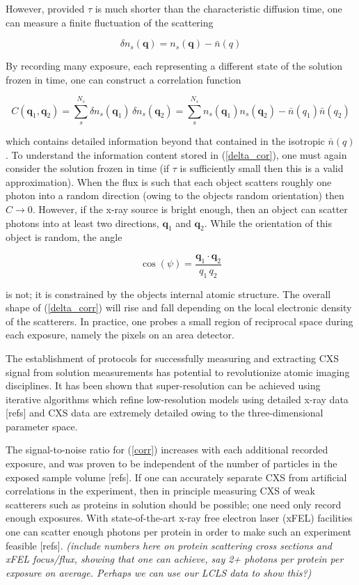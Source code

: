 \documentclass [11pt,fleqn]{article}
\def \be {\begin{equation}}
\def \ee {\end{equation}}
\begin{document}
However, provided $\tau$ is much shorter than the characteristic diffusion time, one can measure a finite fluctuation of the scattering

\be \label{delta_s}
\delta n_s(\bm q) = n_s (\bm q) - \bar n (q )
\ee

By recording many exposure, each representing a different state of the solution frozen in time, one can construct a correlation function

\be \label{delta_cor}
C( \bm q_1, \bm q_2 ) = \sum_s^{N_s} \delta n_s( \bm q_1 )\, \delta n_s( \bm q_2 ) = \sum_s^{N_s} n_s( \bm q_1) n_s (\bm q_2 )  - \bar n( q_1) \bar n(q_2)
\ee

which contains detailed information beyond that contained in the isotropic $\bar n( q)$. To understand the information content stored in (\ref{delta_cor}), one must again consider the solution frozen in time (if $\tau$ is sufficiently small then this is a valid approximation). When the flux is such that each object scatters roughly one photon into a random direction (owing to the objects random orientation) then $C \rightarrow 0$. However, if the x-ray source is bright enough, then an object can scatter photons into at least two directions, $\bm q_1$ and $\bm q_2$. While the orientation of this object is random, the angle 

\be
\cos (\psi) = \frac{\bm q_1 \cdot \bm q_2}{q_1 \, q_2 } 
\ee

is not; it is constrained by the objects internal atomic structure. The overall shape of (\ref{delta_corr}) will rise and fall depending on the local electronic density of the scatterers.  In practice, one probes a small region of reciprocal space during each exposure, namely the pixels on an area detector.

The establishment of protocols for successfully measuring and extracting CXS signal from solution measurements has potential to revolutionize atomic imaging disciplines. It has been shown that super-resolution can be achieved using iterative algorithms which refine low-resolution models using detailed x-ray data [refs] and CXS data are extremely detailed owing to the three-dimensional parameter space. 

The signal-to-noise ratio for (\ref{corr}) increases with each additional recorded exposure, and was proven to be independent of the number of particles in the exposed sample volume [refs]. If one can accurately separate CXS from artificial correlations in the experiment, then in principle measuring CXS of weak scatterers such as proteins in solution should be possible; one need only record enough exposures. With state-of-the-art x-ray free electron laser (xFEL) facilities one can scatter enough photons per protein in order to make such an experiment feasible [refs]. \emph{(include numbers here on protein scattering cross sections and xFEL focus/flux, showing that one can achieve, say 2+ photons per protein per exposure on average. Perhaps we can use our LCLS data to show this?)}
\end{document}
